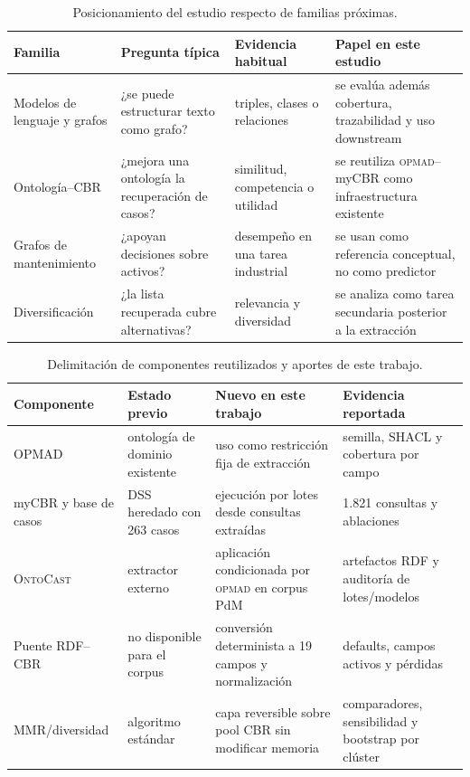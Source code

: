 \documentclass[11pt,a4paper]{article}
\newcommand{\OPMAD}{\textsc{opmad}}
\newcommand{\OntoCast}{\textsc{OntoCast}}
\newcommand{\myCBR}{myCBR}
\begin{document}
\begin{table}[H]
\centering
\caption{Posicionamiento del estudio respecto de familias próximas.}
\label{tab:positioning}
\footnotesize
\begin{tabularx}{\linewidth}{lXXX}
\toprule
Familia & Pregunta típica & Evidencia habitual & Papel en este estudio \\
\midrule
Modelos de lenguaje y grafos & ¿se puede estructurar texto como grafo? & triples, clases o relaciones & se evalúa además cobertura, trazabilidad y uso downstream \\
Ontología--CBR & ¿mejora una ontología la recuperación de casos? & similitud, competencia o utilidad & se reutiliza \OPMAD{}--\myCBR{} como infraestructura existente \\
Grafos de mantenimiento & ¿apoyan decisiones sobre activos? & desempeño en una tarea industrial & se usan como referencia conceptual, no como predictor \\
Diversificación & ¿la lista recuperada cubre alternativas? & relevancia y diversidad & se analiza como tarea secundaria posterior a la extracción \\
\bottomrule
\end{tabularx}
\end{table}

\begin{table}[H]
\centering
\caption{Delimitación de componentes reutilizados y aportes de este trabajo.}
\label{tab:component-boundary}
\footnotesize
\begin{tabularx}{\linewidth}{lXXX}
\toprule
Componente & Estado previo & Nuevo en este trabajo & Evidencia reportada \\
\midrule
OPMAD & ontología de dominio existente & uso como restricción fija de extracción & semilla, SHACL y cobertura por campo \\
\myCBR{} y base de casos & DSS heredado con 263 casos & ejecución por lotes desde consultas extraídas & 1.821 consultas y ablaciones \\
\OntoCast{} & extractor externo & aplicación condicionada por \OPMAD{} en corpus PdM & artefactos RDF y auditoría de lotes/modelos \\
Puente RDF--CBR & no disponible para el corpus & conversión determinista a 19 campos y normalización & defaults, campos activos y pérdidas \\
MMR/diversidad & algoritmo estándar & capa reversible sobre pool CBR sin modificar memoria & comparadores, sensibilidad y bootstrap por clúster \\
\bottomrule
\end{tabularx}
\end{table}
\end{document}
